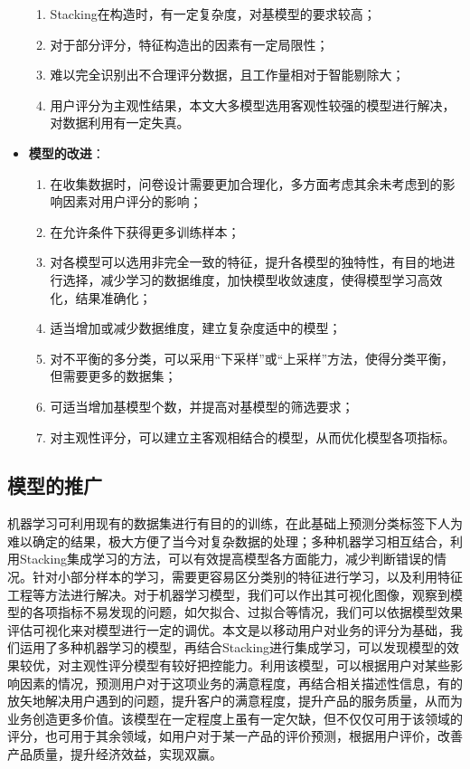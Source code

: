 \documentclass{MathorCupmodeling}
\begin{document}
\begin{itemize}
\begin{enumerate}
				\item Stacking在构造时，有一定复杂度，对基模型的要求较高；
				\item 对于部分评分，特征构造出的因素有一定局限性；
				\item 难以完全识别出不合理评分数据，且工作量相对于智能剔除大；
				\item 用户评分为主观性结果，本文大多模型选用客观性较强的模型进行解决，对数据利用有一定失真。
			\end{enumerate}
		\item \textbf{模型的改进}：
			\begin{enumerate}
				\item 在收集数据时，问卷设计需要更加合理化，多方面考虑其余未考虑到的影响因素对用户评分的影响；
				\item 在允许条件下获得更多训练样本；
				\item 对各模型可以选用非完全一致的特征，提升各模型的独特性，有目的地进行选择，减少学习的数据维度，加快模型收敛速度，使得模型学习高效化，结果准确化；
				\item 适当增加或减少数据维度，建立复杂度适中的模型；
				\item 对不平衡的多分类，可以采用“下采样”或“上采样”方法，使得分类平衡，但需要更多的数据集；
				\item 可适当增加基模型个数，并提高对基模型的筛选要求；
				\item 对主观性评分，可以建立主客观相结合的模型，从而优化模型各项指标。
			\end{enumerate}
	\end{itemize}
	\subsection{模型的推广}
	机器学习可利用现有的数据集进行有目的的训练，在此基础上预测分类标签下人为难以确定的结果，极大方便了当今对复杂数据的处理；多种机器学习相互结合，利用Stacking集成学习的方法，可以有效提高模型各方面能力，减少判断错误的情况。针对小部分样本的学习，需要更容易区分类别的特征进行学习，以及利用特征工程等方法进行解决。对于机器学习模型，我们可以作出其可视化图像，观察到模型的各项指标不易发现的问题，如欠拟合、过拟合等情况，我们可以依据模型效果评估可视化来对模型进行一定的调优。本文是以移动用户对业务的评分为基础，我们运用了多种机器学习的模型，再结合Stacking进行集成学习，可以发现模型的效果较优，对主观性评分模型有较好把控能力。利用该模型，可以根据用户对某些影响因素的情况，预测用户对于这项业务的满意程度，再结合相关描述性信息，有的放矢地解决用户遇到的问题，提升客户的满意程度，提升产品的服务质量，从而为业务创造更多价值。该模型在一定程度上虽有一定欠缺，但不仅仅可用于该领域的评分，也可用于其余领域，如用户对于某一产品的评价预测，根据用户评价，改善产品质量，提升经济效益，实现双赢。
	\newpage
	
\end{document}

